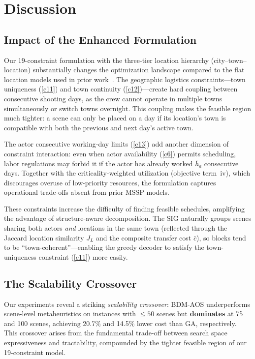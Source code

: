 \section{Discussion}
\label{sec:discussion}

\subsection{Impact of the Enhanced Formulation}

Our 19-constraint formulation with the three-tier location hierarchy (city--town--location) substantially changes the optimization landscape compared to the flat location models used in prior work~\citep{liu2019, tekin2023}.
The geographic logistics constraints---town uniqueness (\ref{c11}) and town continuity (\ref{c12})---create hard coupling between consecutive shooting days, as the crew cannot operate in multiple towns simultaneously or switch towns overnight.
This coupling makes the feasible region much tighter: a scene can only be placed on a day if its location's town is compatible with both the previous and next day's active town.

The actor consecutive working-day limits (\ref{c13}) add another dimension of constraint interaction: even when actor availability (\ref{c6}) permits scheduling, labor regulations may forbid it if the actor has already worked $\bar{h}_a$ consecutive days.
Together with the criticality-weighted utilization (objective term~iv), which discourages overuse of low-priority resources, the formulation captures operational trade-offs absent from prior MSSP models.

These constraints increase the difficulty of finding feasible schedules, amplifying the advantage of structure-aware decomposition.
The SIG naturally groups scenes sharing both actors \emph{and} locations in the same town (reflected through the Jaccard location similarity $J_L$ and the composite transfer cost $\bar{c}$), so blocks tend to be ``town-coherent''---enabling the greedy decoder to satisfy the town-uniqueness constraint (\ref{c11}) more easily.

\subsection{The Scalability Crossover}

Our experiments reveal a striking \emph{scalability crossover}: BDM-AOS underperforms scene-level metaheuristics on instances with $\leq 50$ scenes but \textbf{dominates} at 75 and 100 scenes, achieving 20.7\% and 14.5\% lower cost than GA, respectively.
This crossover arises from the fundamental trade-off between search space expressiveness and tractability, compounded by the tighter feasible region of our 19-constraint model.

